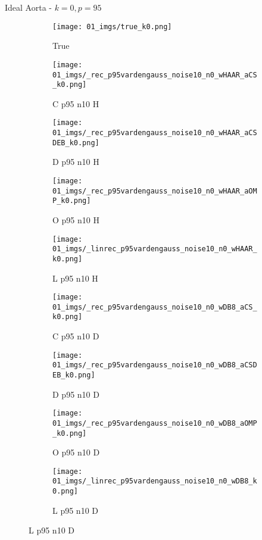 \begin{frame}{Ideal Aorta - $k=0,p=95$}{}
\begin{figure}
\begin{subfigure}{0.1\textwidth}
\texttt{[image: 01\_imgs/true\_k0.png]}
\caption*{\Tiny True}
\end{subfigure}
\begin{subfigure}{0.1\textwidth}
\texttt{[image: 01\_imgs/\_rec\_p95vardengauss\_noise10\_n0\_wHAAR\_aCS\_k0.png]}
\caption*{\Tiny C p95 n10 H}
\end{subfigure}
\begin{subfigure}{0.1\textwidth}
\texttt{[image: 01\_imgs/\_rec\_p95vardengauss\_noise10\_n0\_wHAAR\_aCSDEB\_k0.png]}
\caption*{\Tiny D p95 n10 H}
\end{subfigure}
\begin{subfigure}{0.1\textwidth}
\texttt{[image: 01\_imgs/\_rec\_p95vardengauss\_noise10\_n0\_wHAAR\_aOMP\_k0.png]}
\caption*{\Tiny O p95 n10 H}
\end{subfigure}
\begin{subfigure}{0.1\textwidth}
\texttt{[image: 01\_imgs/\_linrec\_p95vardengauss\_noise10\_n0\_wHAAR\_k0.png]}
\caption*{\Tiny L p95 n10 H}
\end{subfigure}
\begin{subfigure}{0.1\textwidth}
\texttt{[image: 01\_imgs/\_rec\_p95vardengauss\_noise10\_n0\_wDB8\_aCS\_k0.png]}
\caption*{\Tiny C p95 n10 D}
\end{subfigure}
\begin{subfigure}{0.1\textwidth}
\texttt{[image: 01\_imgs/\_rec\_p95vardengauss\_noise10\_n0\_wDB8\_aCSDEB\_k0.png]}
\caption*{\Tiny D p95 n10 D}
\end{subfigure}
\begin{subfigure}{0.1\textwidth}
\texttt{[image: 01\_imgs/\_rec\_p95vardengauss\_noise10\_n0\_wDB8\_aOMP\_k0.png]}
\caption*{\Tiny O p95 n10 D}
\end{subfigure}
\begin{subfigure}{0.1\textwidth}
\texttt{[image: 01\_imgs/\_linrec\_p95vardengauss\_noise10\_n0\_wDB8\_k0.png]}
\caption*{\Tiny L p95 n10 D}
\end{subfigure}

\vspace{5pt}


\end{figure}
\end{frame}
